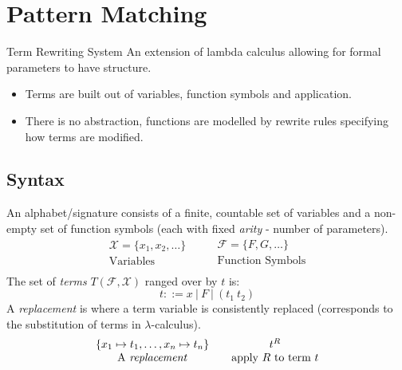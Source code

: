 \chapter{Pattern Matching}

\begin{definitionbox}{Term Rewriting System}
    An extension of lambda calculus allowing for formal parameters to have structure.
    \begin{itemize}
        \item Terms are built out of variables, function symbols and application.
        \item There is no abstraction, functions are modelled by rewrite rules specifying how terms are modified.
    \end{itemize}
\end{definitionbox}

\section{Syntax}

An alphabet/signature consists of a finite, countable set of variables and a non-empty set of function symbols (each with fixed \textit{arity} - number of parameters).
\[\begin{matrix}
    \mathcal{X} = \{x_1, x_2, \dots\} \\
    \text{Variables} \\
\end{matrix} \qquad \begin{matrix}
    \mathcal{F} = \{F, G, \dots\} \\
    \text{Function Symbols}\\
\end{matrix}\]
The set of \textit{terms} $T(\mathcal{F}, \mathcal{X})$ ranged over by $t$ is:
\[t ::= x \ | \ F \ | \ (t_1 \ t_2)\]
A \textit{replacement} is where a term variable is consistently replaced (corresponds to the substitution of terms in $\lambda$-calculus).
\[\begin{matrix}
    \{x_1 \mapsto t_1, \dots , x_n \mapsto t_n\} \\
    \text{A \textit{replacement}} \\
\end{matrix} \qquad \begin{matrix}
    t^R \\
    \text{apply $R$ to term $t$} \\
\end{matrix}\]


